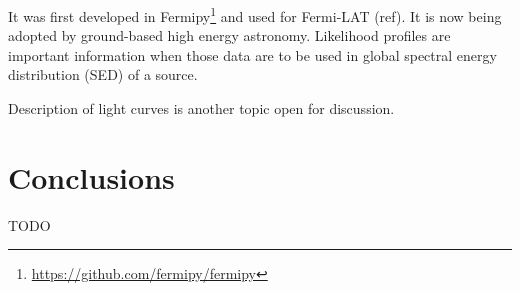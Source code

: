 It was first developed in Fermipy\footnote{\url{https://github.com/fermipy/fermipy}} and used for Fermi-LAT (ref). It is now being adopted by ground-based high energy astronomy. Likelihood profiles are important information when those data are to be used in global spectral energy distribution (SED) of a source. 

Description of light curves is another topic open for discussion. 

\section{Conclusions}

TODO
